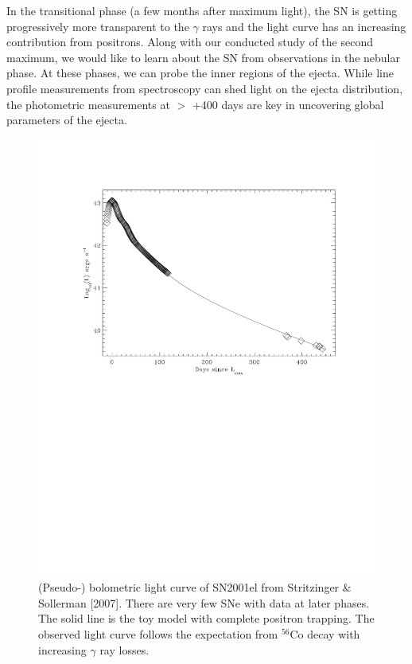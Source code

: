 \documentclass[11pt]{article}
\begin{document}
{In the transitional phase (a few months after maximum light), the SN is getting progressively more transparent to the $\gamma$ rays and the light curve has an increasing contribution from positrons. Along with our conducted study of the second maximum, we would like to learn about the SN from observations in the nebular phase. At these phases, we can probe the inner regions of the ejecta. While line profile measurements from spectroscopy can shed light on the ejecta distribution, the photometric measurements at $>$ +400 days are key in uncovering global parameters of the ejecta. 

 } 
\newpage

\begin{figure}
\includegraphics[width=.8\textwidth, trim=0 300 60 0]{sn01el_bol.pdf}
\caption{(Pseudo-) bolometric light curve of SN2001el from Stritzinger $\&$ Sollerman [2007]. There are very few SNe with data at later phases. The solid line is the toy model with complete positron trapping. The observed light curve follows the expectation from $^{56}$Co decay with increasing $\gamma$ ray losses. }
\label{fig:bol}
\end{figure}
\end{document}
